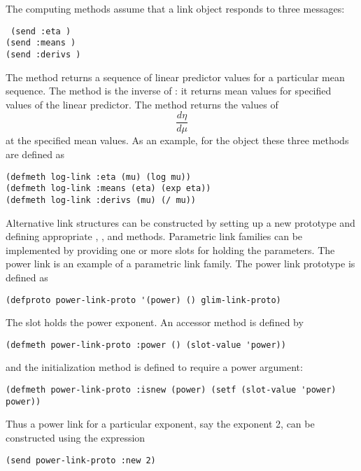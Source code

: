 The  computing methods assume that a link object
responds to three messages:
\begin{flushleft}\tt
(send  :eta )\\
(send  :means )\\
(send  :derivs )
\end{flushleft}
The  method returns a sequence of linear predictor values
for a particular mean sequence. The  method is the
inverse of : it returns mean values for specified values
of the linear predictor. The  method returns the values of
\begin{displaymath}
\frac{d\eta}{d\mu}
\end{displaymath}
at the specified mean values. As an example, for the 
object these three methods are defined as
\begin{verbatim}
(defmeth log-link :eta (mu) (log mu))
(defmeth log-link :means (eta) (exp eta))
(defmeth log-link :derivs (mu) (/ mu))
\end{verbatim}

Alternative link structures can be constructed by setting up a new
prototype and defining appropriate , , and
 methods. Parametric link families can be implemented by
providing one or more slots for holding the parameters. The power link
is an example of a parametric link family. The power link prototype
is defined as
\begin{verbatim}
(defproto power-link-proto '(power) () glim-link-proto)
\end{verbatim}
The slot  holds the power exponent. An accessor method
is defined by
\begin{verbatim}
(defmeth power-link-proto :power () (slot-value 'power))
\end{verbatim}
and the  initialization method is defined to require a
power argument:
\begin{verbatim}
(defmeth power-link-proto :isnew (power) (setf (slot-value 'power) power))
\end{verbatim}
Thus a power link for a particular exponent, say the exponent 2, can
be constructed using the expression
\begin{verbatim}
(send power-link-proto :new 2)
\end{verbatim}

